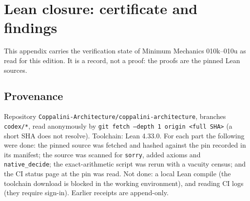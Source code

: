 \documentclass[11pt,a4paper]{article}
\newcommand{\bs}[1]{\texttt{#1}}
\theoremstyle{plain}
\theoremstyle{definition}
\theoremstyle{remark}
\begin{document}
\section{Lean closure: certificate and findings}\label{app:E}
This appendix carries the verification state of Minimum Mechanics 010k--010u as read for this edition. It is a record, not a proof: the proofs are the pinned Lean sources.

\subsection{Provenance}
Repository \texttt{Coppalini-Architecture/coppalini-architecture}, branches \texttt{codex/*}, read anonymously by \texttt{git fetch --depth 1 origin <full SHA>} (a short SHA does not resolve). Toolchain: Lean 4.33.0. For each part the following were done: the pinned source was fetched and hashed against the pin recorded in its manifest; the source was scanned for \bs{sorry}, added axioms and \bs{native\_decide}; the exact-arithmetic script was rerun with a vacuity census; and the CI status page at the pin was read. Not done: a local Lean compile (the toolchain download is blocked in the working environment), and reading CI logs (they require sign-in). Earlier receipts are append-only.
\end{document}
